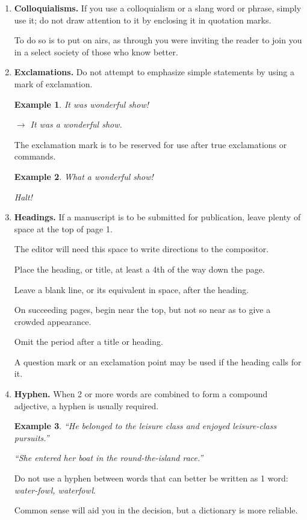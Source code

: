 \documentclass{article}
\newtheorem{example}{Example}
\begin{document}
\begin{enumerate}
	\item {\bf Colloquialisms.} If you use a colloquialism or a slang word or phrase, simply use it; do not draw attention to it by enclosing it in quotation marks.
	
	To do so is to put on airs, as through you were inviting the reader to join you in a select society of those who know better.
	\item {\bf Exclamations.} Do not attempt to emphasize simple statements by using a mark of exclamation.
	\begin{example}
		It was wonderful show!
		
		$\to$ It was a wonderful show.
	\end{example}
	The exclamation mark is to be reserved for use after true exclamations or commands.
	\begin{example}
		What a wonderful show!
		
		Halt!
	\end{example}
	\item {\bf Headings.} If a manuscript is to be submitted for publication, leave plenty of space at the top of page 1.
	
	The editor will need this space to write directions to the compositor.
	
	Place the heading, or title, at least a 4th of the way down the page.
	
	Leave a blank line, or its equivalent in space, after the heading.
	
	On succeeding pages, begin near the top, but not so near as to give a crowded appearance.
	
	Omit the period after a title or heading.
	
	A question mark or an exclamation point may be used if the heading calls for it.
	\item {\bf Hyphen.} When 2 or more words are combined to form a compound adjective, a hyphen is usually required.
	\begin{example}
		``He belonged to the leisure class and enjoyed leisure-class pursuits.''
		
		``She entered her boat in the round-the-island race.''
	\end{example}
	Do not use a hyphen between words that can better be written as 1 word: {\it water-fowl, waterfowl}.
	
	Common sense will aid you in the decision, but a dictionary is more reliable.
	

\end{enumerate}
\end{document}
